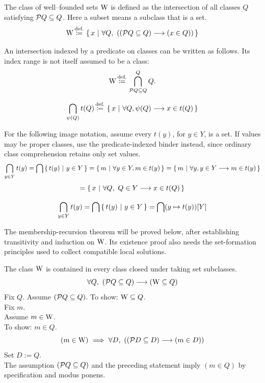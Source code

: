 \begin{definition}
The class of well--founded sets $\mathrm{W}$ is defined as the intersection of all classes $Q$ satisfying $\mathcal{P} Q\subseteq Q$. Here a subset means a subclass that is a set.
\[
\mathrm{W}
\,{\stackrel{{\textrm{def.}}}{\coloneqq}}\,
\left\{\,x\ \middle|\ \forall Q,\ ((\mathcal{P} Q\subseteq Q)\longrightarrow (x\in Q))\,\right\}
\]
\end{definition}
\begin{notation}
An intersection indexed by a predicate on classes can be written as follows. Its index range is not itself assumed to be a class:
\[
\mathrm{W}\,{\stackrel{{\textrm{def.}}}{\coloneqq}}\, \bigcap^Q\limits_{\mathcal{P} Q\subseteq Q} Q.
\]

\[
\bigcap_{\psi(Q)} t(Q)
\,{\stackrel{{\textrm{def.}}}{\coloneqq}}\,
\left\{\,x\ \middle|\ \forall Q, \psi(Q) \longrightarrow x\in t(Q)\,\right\}
\]



For the following image notation, assume every $t(y)$, for $y\in Y$,
is a set. If values may be proper classes, use the predicate-indexed binder
instead, since ordinary class comprehension retains only set values.
\[
\bigcap_{y\in Y} t(y)
=\bigcap\left\{\,t(y)\ \middle|\ y\in Y\,\right\}
=\left\{\,m\ \middle|\ \forall y\in Y, m\in t(y)\,\right\}
=\left\{\,m\ \middle|\ \forall y, y\in Y \longrightarrow m\in t(y)\,\right\}
\]
\[
=\left\{\,x\ \middle|\ \forall Q,\ Q\in Y \longrightarrow x\in t(Q)\,\right\}
\]

\[
\bigcap_{y\in Y} t(y)
= \bigcap \left\{\,t(y)\ \middle|\ {y\in Y}\,\right\}
= \bigcap (y\mapsto t(y))[Y]
\]
\end{notation}
The membership-recursion theorem will be proved below, after establishing
transitivity and induction on $\mathrm{W}$. Its existence proof also needs the
set-formation principles used to collect compatible local solutions.
\begin{lemma}[minimality of W]
The class $\mathrm{W}$ is contained in every class closed under taking set subclasses.
\[
\forall Q,\ (\mathcal{P} Q\subseteq Q) \longrightarrow (\mathrm{W}\subseteq Q)
\]
\Proof
Fix $Q$. Assume $(\mathcal{P} Q\subseteq Q)$. To show: $\mathrm{W}\subseteq Q$.\\
Fix $m$.\\
Assume $m\in\mathrm{W}$.\\
To show: $m\in Q$.
\[
(m\in\mathrm{W})
\ \Longrightarrow\ 
\forall D,\ ((\mathcal{P} D\subseteq D)\longrightarrow (m\in D))
\]
Set $D:=Q$.\\
The assumption $(\mathcal{P} Q\subseteq Q)$ and the preceding statement imply $(m\in Q)$ by specification and modus ponens.
\DoneNoPar
\end{lemma}
